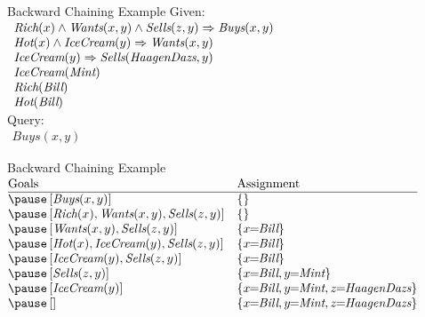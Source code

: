 \documentclass[14pt]{beamer}
\begin{document}
\begin{frame}{Backward Chaining Example}
	Given:
	\\[.5em]
	$
	\begin{array}{l}
		\textit{Rich}(x) \land \textit{Wants}(x, y) \land \textit{Sells}(z, y) \Rightarrow \textit{Buys}(x, y) \\
		\textit{Hot}(x) \land \textit{IceCream}(y) \Rightarrow \textit{Wants}(x, y) \\
		\textit{IceCream}(y) \Rightarrow \textit{Sells}(\textit{HaagenDazs}, y) \\
		\textit{IceCream}(\textit{Mint}) \\
		\textit{Rich}(\textit{Bill}) \\
		\textit{Hot}(\textit{Bill})
	\end{array}
	$
	\\[1em]
	Query:
	\\[.5em]
	$
	\begin{array}{l}
		\textit{Buys}(x, y)
	\end{array}
	$
\end{frame}
\begin{frame}{Backward Chaining Example}
	\small
	$
	\begin{array}{@{}ll@{}}
		\mbox{Goals}                                                        & \mbox{Assignment} \\
		\hline
		\pause\left[\textit{Buys}(x, y)\right]                                  & \{\} \\
		\pause\left[\textit{Rich}(x), \textit{Wants}(x, y), \textit{Sells}(z, y)\right] & \{\} \\
		\pause\left[\textit{Wants}(x, y), \textit{Sells}(z, y)\right]               & \{x\!\!=\!\!\textit{Bill}\} \\
		\pause\left[\textit{Hot}(x), \textit{IceCream}(y), \textit{Sells}(z, y)\right]  & \{x\!\!=\!\!\textit{Bill}\} \\
		\pause\left[\textit{IceCream}(y), \textit{Sells}(z, y)\right]               & \{x\!\!=\!\!\textit{Bill}\} \\
		\pause\left[\textit{Sells}(z, y)\right]                                 & \{x\!\!=\!\!\textit{Bill}, y\!\!=\!\!\textit{Mint}\} \\
		\pause\left[\textit{IceCream}(y)\right]                                 & \{x\!\!=\!\!\textit{Bill}, y\!\!=\!\!\textit{Mint}, z\!\!=\!\!\textit{HaagenDazs}\} \\
		\pause\left[\right]                                                 & \{x\!\!=\!\!\textit{Bill}, y\!\!=\!\!\textit{Mint}, z\!\!=\!\!\textit{HaagenDazs}\} \\
	\end{array}
	$
\end{frame}
\end{document}
